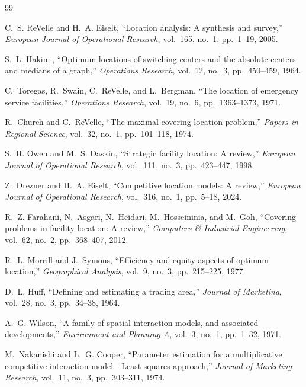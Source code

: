 \documentclass[conference]{IEEEtran}
\begin{document}
\begin{thebibliography}{99}

C.~S. ReVelle and H.~A. Eiselt, ``Location analysis: A synthesis and
survey,'' \textit{European Journal of Operational Research}, vol.~165,
no.~1, pp.~1--19, 2005.

S.~L. Hakimi, ``Optimum locations of switching centers and the absolute
centers and medians of a graph,'' \textit{Operations Research},
vol.~12, no.~3, pp.~450--459, 1964.

C.~Toregas, R.~Swain, C.~ReVelle, and L.~Bergman, ``The location of
emergency service facilities,'' \textit{Operations Research}, vol.~19,
no.~6, pp.~1363--1373, 1971.

R.~Church and C.~ReVelle, ``The maximal covering location problem,''
\textit{Papers in Regional Science}, vol.~32, no.~1, pp.~101--118,
1974.

S.~H. Owen and M.~S. Daskin, ``Strategic facility location: A review,''
\textit{European Journal of Operational Research}, vol.~111, no.~3,
pp.~423--447, 1998.

Z.~Drezner and H.~A. Eiselt, ``Competitive location models: A review,''
\textit{European Journal of Operational Research}, vol.~316, no.~1,
pp.~5--18, 2024.

R.~Z. Farahani, N.~Asgari, N.~Heidari, M.~Hosseininia, and M.~Goh,
``Covering problems in facility location: A review,''
\textit{Computers \& Industrial Engineering}, vol.~62, no.~2,
pp.~368--407, 2012.

R.~L. Morrill and J.~Symons, ``Efficiency and equity aspects of optimum
location,'' \textit{Geographical Analysis}, vol.~9, no.~3,
pp.~215--225, 1977.

D.~L. Huff, ``Defining and estimating a trading area,''
\textit{Journal of Marketing}, vol.~28, no.~3, pp.~34--38, 1964.

A.~G. Wilson, ``A family of spatial interaction models, and associated
developments,'' \textit{Environment and Planning A}, vol.~3, no.~1,
pp.~1--32, 1971.

M.~Nakanishi and L.~G. Cooper, ``Parameter estimation for a
multiplicative competitive interaction model---Least squares
approach,'' \textit{Journal of Marketing Research}, vol.~11, no.~3,
pp.~303--311, 1974.


\end{thebibliography}
\end{document}
